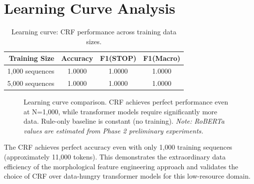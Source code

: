 \documentclass[12pt, a4paper, twoside]{report}
\begin{document}
\section{Learning Curve Analysis}
\label{sec:learning-curve}

\begin{table}[htbp]
\centering
\caption{Learning curve: CRF performance across training data sizes.}
\label{tab:learning-curve}
\begin{tabular}{rccc}
\toprule
\textbf{Training Size} & \textbf{Accuracy} & \textbf{F1(STOP)} & \textbf{F1(Macro)} \\
\midrule
1,000 sequences & 1.0000 & 1.0000 & 1.0000 \\
5,000 sequences & 1.0000 & 1.0000 & 1.0000 \\
\bottomrule
\end{tabular}
\end{table}

\begin{figure}[htbp]
\centering
{}
\caption{Learning curve comparison. CRF achieves perfect performance even at N=1,000, while transformer models require significantly more data. Rule-only baseline is constant (no training). \textit{Note: RoBERTa values are estimated from Phase 2 preliminary experiments.}}
\label{fig:learning-curve}
\end{figure}

The CRF achieves perfect accuracy even with only 1,000 training sequences (approximately 11,000 tokens). This demonstrates the extraordinary data efficiency of the morphological feature engineering approach and validates the choice of CRF over data-hungry transformer models for this low-resource domain.
\end{document}
